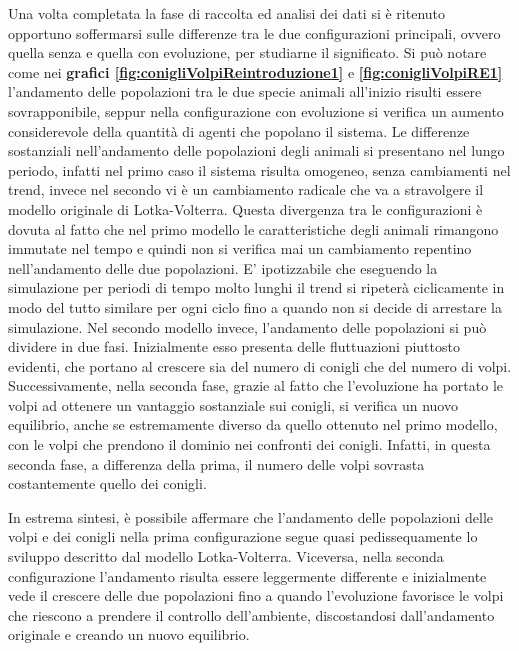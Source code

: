 \documentclass[11pt]{article}
\begin{document}
Una volta completata la fase di raccolta ed analisi dei dati si è ritenuto opportuno soffermarsi sulle differenze tra le due configurazioni principali, ovvero quella senza e quella con evoluzione, per studiarne il significato. Si può notare come nei \textbf{grafici \ref{fig:conigliVolpiReintroduzione1}} e \textbf{\ref{fig:conigliVolpiRE1}} l'andamento delle popolazioni tra le due specie animali all'inizio risulti essere sovrapponibile, seppur nella configurazione con evoluzione si verifica un aumento considerevole della quantità di agenti che popolano il sistema. Le differenze sostanziali nell'andamento delle popolazioni degli animali si presentano nel lungo periodo, infatti nel primo caso il sistema risulta omogeneo, senza cambiamenti nel trend, invece nel secondo vi è un cambiamento radicale  che va a stravolgere il modello originale di Lotka-Volterra. Questa divergenza tra le configurazioni è dovuta al fatto che nel primo modello le caratteristiche degli animali rimangono immutate nel tempo e quindi non si verifica mai un cambiamento repentino nell'andamento delle due popolazioni. E' ipotizzabile che eseguendo la simulazione per periodi di tempo molto lunghi il trend si ripeterà ciclicamente in modo del tutto similare per ogni ciclo fino a quando non si decide di arrestare la simulazione. Nel secondo modello invece, l'andamento delle popolazioni si può dividere in due fasi. Inizialmente esso presenta delle fluttuazioni piuttosto evidenti, che portano al crescere sia del numero di conigli che del numero di volpi. Successivamente, nella seconda fase, grazie al fatto che l'evoluzione  ha portato le volpi ad ottenere un vantaggio sostanziale sui conigli, si verifica un nuovo equilibrio, anche se estremamente diverso da quello ottenuto nel primo modello, con le volpi che prendono il dominio nei confronti dei conigli. Infatti, in questa seconda fase, a differenza della prima, il numero delle volpi sovrasta costantemente quello dei conigli.

In estrema sintesi, è possibile affermare che l'andamento delle popolazioni delle volpi e dei conigli nella prima configurazione segue quasi pedissequamente lo sviluppo descritto dal modello Lotka-Volterra. Viceversa, nella seconda configurazione l'andamento risulta essere leggermente differente e inizialmente vede il crescere delle due popolazioni fino a quando l'evoluzione favorisce le volpi che riescono a prendere il controllo dell'ambiente, discostandosi dall'andamento originale e creando un nuovo equilibrio.   
\end{document}
